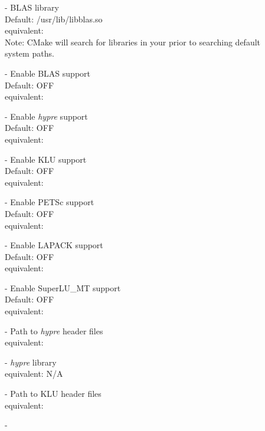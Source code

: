 \begin{description}
\item[] - 
  BLAS library
  \\
  Default: /usr/lib/libblas.so
  \\
  {\sundials} equivalent: 
  \\
  Note: CMake will search for libraries in your  prior
  to searching default system paths.
\item[] - 
  Enable BLAS support
  \\
  Default: OFF
  \\
  {\sundials} equivalent: 
\item[] - 
  Enable \textit{hypre} support
  \\
  Default: OFF
  \\
  {\sundials} equivalent: 
\item[] - 
  Enable KLU support
  \\
  Default: OFF
  \\
  {\sundials} equivalent: 
\item[] - 
  Enable PETSc support
  \\
  Default: OFF
  \\
  {\sundials} equivalent: 
\item[] - 
  Enable LAPACK support
  \\
  Default: OFF
  \\
  {\sundials} equivalent: 
\item[] - 
  Enable SuperLU\_MT support
  \\
  Default: OFF
  \\
  {\sundials} equivalent: 
\item[] - 
  Path to \textit{hypre} header files
  \\
  {\sundials} equivalent: 
\item[] - 
  \textit{hypre} library
  \\
  {\sundials} equivalent: N/A
\item[] - 
  Path to KLU header files
  \\
  {\sundials} equivalent: 
\item[] - 

\end{description}
